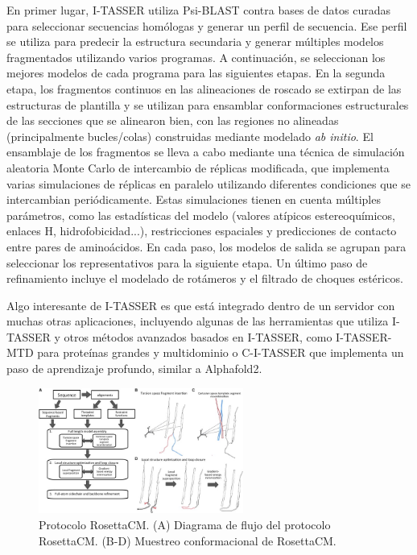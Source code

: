 En primer lugar, I-TASSER utiliza Psi-BLAST contra bases de datos curadas para seleccionar secuencias homólogas y generar un perfil de secuencia. Ese perfil se utiliza para predecir la estructura secundaria y generar múltiples modelos fragmentados utilizando varios programas. A continuación, se seleccionan los mejores modelos de cada programa para las siguientes etapas. En la segunda etapa, los fragmentos continuos en las alineaciones de roscado se extirpan de las estructuras de plantilla y se utilizan para ensamblar conformaciones estructurales de las secciones que se alinearon bien, con las regiones no alineadas (principalmente bucles/colas) construidas mediante modelado \textit{ab initio}. El ensamblaje de los fragmentos se lleva a cabo mediante una técnica de simulación aleatoria Monte Carlo de intercambio de réplicas modificada, que implementa varias simulaciones de réplicas en paralelo utilizando diferentes condiciones que se intercambian periódicamente. Estas simulaciones tienen en cuenta múltiples parámetros, como las estadísticas del modelo (valores atípicos estereoquímicos, enlaces H, hidrofobicidad...), restricciones espaciales y predicciones de contacto entre pares de aminoácidos. En cada paso, los modelos de salida se agrupan para seleccionar los representativos para la siguiente etapa. Un último paso de refinamiento incluye el modelado de rotámeros y el filtrado de choques estéricos.

Algo interesante de I-TASSER es que está integrado dentro de un servidor con muchas otras aplicaciones, incluyendo algunas de las herramientas que utiliza I-TASSER y otros métodos avanzados basados en I-TASSER, como I-TASSER-MTD para proteínas grandes y multidominio o C-I-TASSER que implementa un paso de aprendizaje profundo, similar a Alphafold2.

\begin{figure}[h]
\centering
\includegraphics[width = 0.6\textwidth]{figs/rosettaCM.jpg}
\caption{Protocolo RosettaCM. (A) Diagrama de flujo del protocolo RosettaCM. (B-D) Muestreo conformacional de RosettaCM.}
\end{figure}


